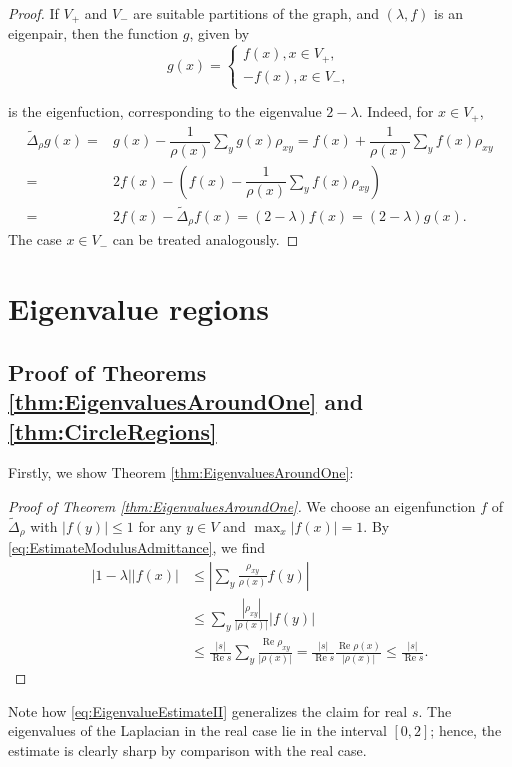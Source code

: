\documentclass[a4paper,11pt]{amsart}
\theoremstyle{definition}
\renewcommand{\Re}{\operatorname{Re}}%
\begin{document}
\begin{proof}
If $V_+$ and $V_-$ are suitable partitions of the graph, and $(\lambda,f)$ is an eigenpair, then the function $g$, given by
\begin{equation*}
g(x)=\begin{cases}
f(x), x\in V_+,\\
-f(x), x\in V_-,
\end{cases}
\end{equation*}

is the eigenfuction, corresponding to the eigenvalue $2-\lambda$. Indeed, for $x\in V_+$,
\begin{align*}
{\widetilde\Delta_\rho g(x)}=&{g(x)}-\dfrac{1}{{\rho(x)}}\sum_{y}{ g(x)}\rho_{xy}={f(x)}+\dfrac{1}{{\rho(x)}}\sum_{y}{ f(x)}\rho_{xy}\\
=&2{f(x)}-\left(f(x)-\dfrac{1}{{\rho(x)}}\sum_{y}{ f(x)}\rho_{xy}\right)\\
=&2f(x)-{\widetilde\Delta_\rho f(x)}=(2-\lambda)f(x)=(2-\lambda)g(x).
\end{align*}
The case $x\in V_-$ can be treated analogously.
\end{proof}

\section{Eigenvalue regions}
\label{section:EigenvalueRegions}
\subsection{Proof of Theorems \ref{thm:EigenvaluesAroundOne} and \ref{thm:CircleRegions}}
Firstly, we show Theorem \ref{thm:EigenvaluesAroundOne}:
\begin{proof}[Proof of Theorem \ref{thm:EigenvaluesAroundOne}]
We choose an eigenfunction $f$ of $\widetilde \Delta_{\rho}$ with $|f(y)| \leq 1$ for any $y \in V$ and $\max_ x|f(x)| = 1$.
By \eqref{eq:EstimateModulusAdmittance}, we find
\begin{align*}
|1 - \lambda| |f(x)| &\leq \left| \sum_y \frac{\rho_{xy}}{\rho(x)} f(y) \right| \\
&\leq \sum_y  \frac{|\rho_{xy}|}{|\rho(x)|} |f(y)| \\
&\leq \frac{|s|}{\Re s} \sum_y \frac{\Re \rho_{xy}}{|\rho(x)|} = \frac{|s|}{\Re s} \frac{\Re \rho(x)}{|\rho(x)|}\le  \frac{|s|}{\Re s}.
\end{align*}
\end{proof}
Note how \eqref{eq:EigenvalueEstimateII} generalizes the claim for real $s$. The eigenvalues of the Laplacian in the real case lie in the interval $[0,2]$; hence, the estimate is clearly sharp by comparison with the real case.
\end{document}
